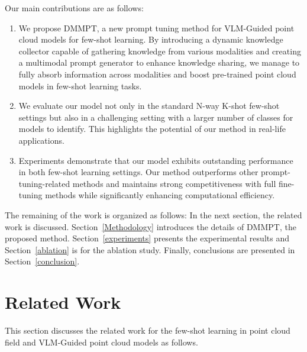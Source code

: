 \documentclass{ecai}
\begin{document}
Our main contributions are as follows:
\begin{enumerate}
    \item  We propose DMMPT, a new prompt tuning method for VLM-Guided point cloud models for few-shot learning. By introducing a dynamic knowledge collector capable of gathering knowledge from various modalities and creating a multimodal prompt generator to enhance knowledge sharing, we manage to fully absorb information across modalities and boost pre-trained point cloud models in few-shot learning tasks.
    \item We evaluate our model not only in the standard N-way K-shot few-shot settings but also in a challenging setting with a larger number of classes for models to identify. This highlights the potential of our method in real-life applications.
    \item Experiments demonstrate that our model exhibits outstanding performance in both few-shot learning settings. Our method outperforms other prompt-tuning-related methods and maintains strong competitiveness with full fine-tuning methods while significantly enhancing computational efficiency.
\end{enumerate} 

The remaining of the work is organized as follows: In the next section, the related work is discussed. Section~\ref{Methodology} introduces the details of DMMPT, the proposed method. Section~\ref{experiments} presents the experimental results and Section~\ref{ablation} is for the ablation study. Finally, conclusions are presented in Section~\ref{conclusion}.

\section{Related Work}
This section discusses the related work for the few-shot learning in point cloud field and VLM-Guided point cloud models as follows.
\end{document}
